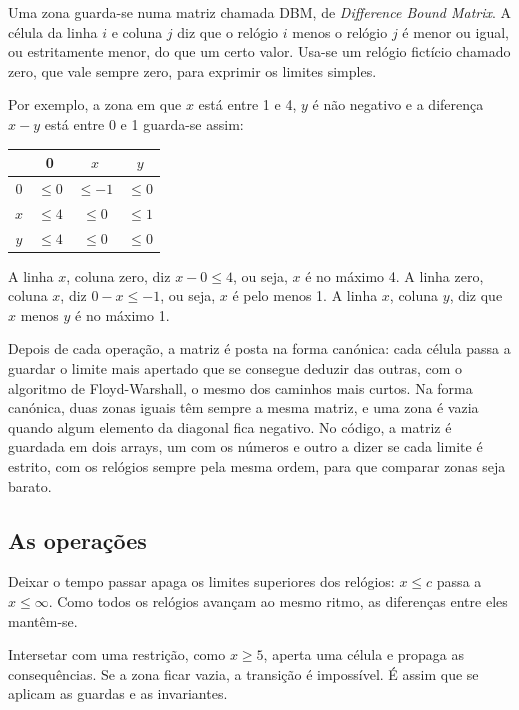 \documentclass[11pt,a4paper]{article}
\begin{document}
Uma zona guarda-se numa matriz chamada DBM, de \emph{Difference Bound Matrix}. A célula da linha \(i\) e coluna \(j\) diz que o relógio \(i\) menos o relógio \(j\) é menor ou igual, ou estritamente menor, do que um certo valor. Usa-se um relógio fictício chamado zero, que vale sempre zero, para exprimir os limites simples.

Por exemplo, a zona em que \(x\) está entre 1 e 4, \(y\) é não negativo e a diferença \(x - y\) está entre 0 e 1 guarda-se assim:

\begin{center}
\begin{tabular}{c|ccc}
 & 0 & \(x\) & \(y\) \\ \hline
0 & \(\leq 0\) & \(\leq -1\) & \(\leq 0\) \\
\(x\) & \(\leq 4\) & \(\leq 0\) & \(\leq 1\) \\
\(y\) & \(\leq 4\) & \(\leq 0\) & \(\leq 0\)
\end{tabular}
\end{center}

A linha \(x\), coluna zero, diz \(x - 0 \leq 4\), ou seja, \(x\) é no máximo 4. A linha zero, coluna \(x\), diz \(0 - x \leq -1\), ou seja, \(x\) é pelo menos 1. A linha \(x\), coluna \(y\), diz que \(x\) menos \(y\) é no máximo 1.

Depois de cada operação, a matriz é posta na forma canónica: cada célula passa a guardar o limite mais apertado que se consegue deduzir das outras, com o algoritmo de Floyd-Warshall, o mesmo dos caminhos mais curtos. Na forma canónica, duas zonas iguais têm sempre a mesma matriz, e uma zona é vazia quando algum elemento da diagonal fica negativo. No código, a matriz é guardada em dois arrays, um com os números e outro a dizer se cada limite é estrito, com os relógios sempre pela mesma ordem, para que comparar zonas seja barato.

\subsection{As operações}

Deixar o tempo passar apaga os limites superiores dos relógios: \(x \leq c\) passa a \(x \leq \infty\). Como todos os relógios avançam ao mesmo ritmo, as diferenças entre eles mantêm-se.

Intersetar com uma restrição, como \(x \geq 5\), aperta uma célula e propaga as consequências. Se a zona ficar vazia, a transição é impossível. É assim que se aplicam as guardas e as invariantes.
\end{document}
